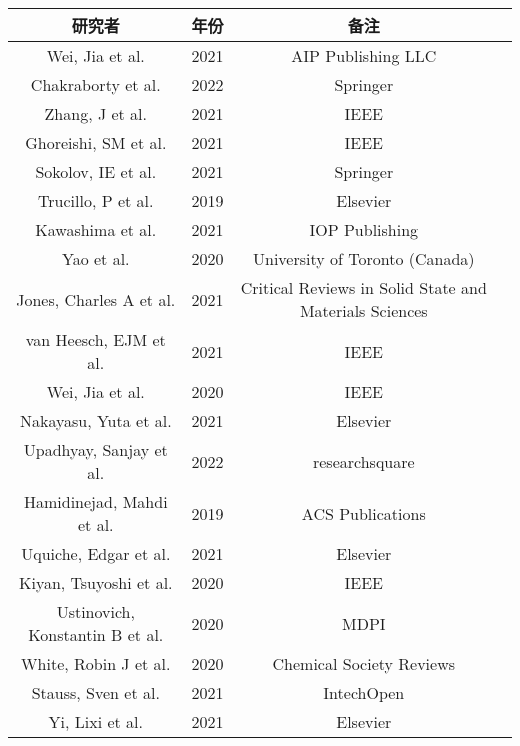 \begin{center}
\begin{tabular}{cccc}
\hline
研究者 & 年份 & 备注 \\
\hline
Wei, Jia et al. \cite{wei2020breakdown} & 2021 & AIP Publishing LLC \\
Chakraborty et al. \cite{chakraborty2022metals} & 2022 & Springer \\
Zhang, J et al. \cite{zhang2015breakdown} & 2021 & IEEE \\
Ghoreishi, SM et al. \cite{ghoreishi2010synthesis} & 2021 & IEEE \\
Sokolov, IE et al. \cite{sokolov2021analysis} & 2021 & Springer \\
Trucillo, P et al. \cite{trucillo2019production} & 2019 & Elsevier \\
Kawashima et al. \cite{kawashima2007supercritical} & 2021 & IOP Publishing \\
Yao et al. \cite{yao2018development} & 2020 & University of Toronto (Canada) \\
Jones, Charles A et al. \cite{jones2004applications} & 2021 & Critical Reviews in Solid State and Materials Sciences \\
van Heesch, EJM et al. \cite{van2014supercritical} & 2021 & IEEE \\
Wei, Jia et al. \cite{wei2020electrical} & 2020 & IEEE \\
Nakayasu, Yuta et al. \cite{nakayasu2017fabrication} & 2021 & Elsevier \\
Upadhyay, Sanjay et al. \cite{upadhyay2022facile} & 2022 & researchsquare \\
Hamidinejad, Mahdi et al. \cite{hamidinejad2019insight} & 2019 & ACS Publications \\
Uquiche, Edgar et al. \cite{uquiche2004supercritical} & 2021 & Elsevier \\
Kiyan, Tsuyoshi et al. \cite{kiyan2011weibull} & 2020 & IEEE \\
Ustinovich, Konstantin B et al. \cite{ustinovich2020study} & 2020 & MDPI \\
White, Robin J et al. \cite{white2009supported} & 2020 & Chemical Society Reviews \\
Stauss, Sven et al. \cite{stauss2016pulsed} & 2021 & IntechOpen \\
Yi, Lixi et al. \cite{yi2015hierarchical} & 2021 & Elsevier \\
\hline
\end{tabular}
\end{center}

